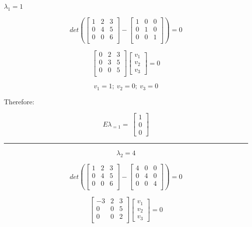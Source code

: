 \documentclass[]{article}
\begin{document}
\(\lambda_1 = 1\)

\[
det( 
\begin{bmatrix}
   1 & 2 & 3 \\
   0 & 4 & 5 \\
   0 & 0 & 6 \\
\end{bmatrix}
-
\begin{bmatrix}
   1 & 0 & 0 \\
   0 & 1  & 0 \\
   0 & 0 & 1 \\
\end{bmatrix}
) = 0
\]

\[
\begin{bmatrix}
   0 & 2 & 3 \\
   0 & 3 & 5 \\
   0 & 0 & 5 \\
\end{bmatrix}
\begin{bmatrix}
v_1 \\
v_2 \\
v_3
\end{bmatrix}
=0
\]

\[v_1 = 1;~v_2 = 0;~v_3 = 0\]

Therefore:

\[
E\lambda_{=1} = \
\begin{bmatrix}
1 \\
0 \\
0
\end{bmatrix}
\]

\begin{center}\rule{0.5\linewidth}{\linethickness}\end{center}

\newpage

\[\lambda_2 = 4\]

\[
det( 
\begin{bmatrix}
   1 & 2 & 3 \\
   0 & 4 & 5 \\
   0 & 0 & 6 \\
\end{bmatrix}
-
\begin{bmatrix}
   4 & 0 & 0 \\
   0 & 4  & 0 \\
   0 & 0 & 4 \\
\end{bmatrix}
) = 0
\]

\[
\begin{bmatrix}
   -3 & 2 & 3 \\
   0 & 0 & 5 \\
   0 & 0 & 2 \\
\end{bmatrix}
\begin{bmatrix}
v_1 \\
v_2 \\
v_3
\end{bmatrix}
=0
\]
\end{document}

